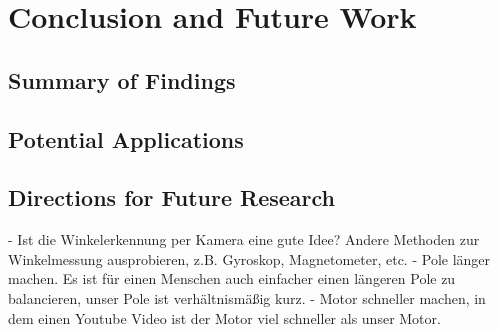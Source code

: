 \chapter{Conclusion and Future Work}

\section{Summary of Findings}

\section{Potential Applications}

\section{Directions for Future Research}
- Ist die Winkelerkennung per Kamera eine gute Idee? Andere Methoden zur Winkelmessung ausprobieren, z.B. Gyroskop, Magnetometer, etc.
- Pole länger machen. Es ist für einen Menschen auch einfacher einen längeren Pole zu balancieren, unser Pole ist verhältnismäßig kurz.
- Motor schneller machen, in dem einen Youtube Video ist der Motor viel schneller als unser Motor.